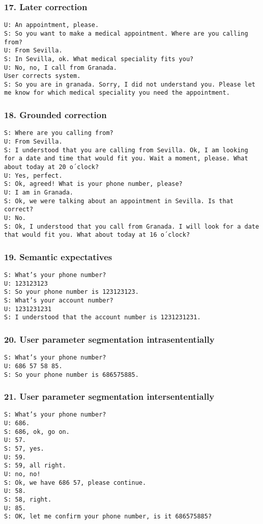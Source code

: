 \documentclass[11pt]{beamer}
\newcommand{\system}[1]{{\color{red}\texttt{S: #1}}\\}
\newcommand{\user}[1]{{\color{teal}\texttt{U: #1}}\\}
\newcommand{\comment}[1]{{\color{orange}\texttt{#1}}\\}
\begin{document}
\begin{frame}
\frametitle{17. Later correction}
\user{An appointment, please.}
\system{So you want to make a medical appointment. Where are you calling from?}
\user{From Sevilla.}
\system{In Sevilla, ok. What medical speciality fits you?}
\user{No, no, I call from Granada.}
\vspace{10pt}
\comment{User corrects system.}
\vspace{10pt}
\system{So you are in granada. Sorry, I did not understand you. Please let me know for which medical speciality you need the appointment.}
\end{frame}

\begin{frame}
\frametitle{18. Grounded correction}
\system{Where are you calling from?}
\user{From Sevilla.}
\system{I understood that you are calling from Sevilla. Ok, I am looking for a date and time that would fit you. Wait a moment, please. What about today at 20 o´clock? }
\user{Yes, perfect.}
\system{Ok, agreed! What is your phone number, please?}
\user{I am in Granada.}
\system{Ok, we were talking about an appointment in Sevilla. Is that correct?}
\user{No.}
\system{Ok, I understood that you call from Granada. I will look for a date that would fit you. What about today at 16 o´clock?}
\end{frame}

\begin{frame}
\frametitle{19. Semantic expectatives}
\system{What's your phone number?}
\user{123123123}
\system{So your phone number is 123123123.}
\vspace{10pt}
\system{What's your account number?}
\user{1231231231}
\system{I understood that the account number is 1231231231.}
\end{frame}

\begin{frame}
\frametitle{20. User parameter segmentation intrasententially}
\system{What's your phone number?}
\user{686 57 58 85.}
\system{So your phone number is 686575885.}
\end{frame}

\begin{frame}
\frametitle{21. User parameter segmentation intersententially}
\system{What's your phone number?}
\user{686.}
\system{686, ok, go on.}
\user{57.}
\system{57, yes.}
\user{59.}
\system{59, all right.}
\user{no, no!}
\system{Ok, we have 686 57, please continue.}
\user{58.}
\system{58, right.}
\user{85.}
\system{OK, let me confirm your phone number, is it 686575885?}
\end{frame}
\end{document}
